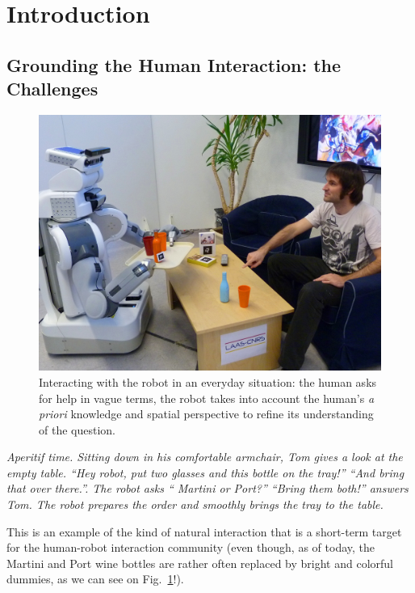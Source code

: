 \documentclass{svmult}
\begin{document}
\section{Introduction}

\subsection{Grounding the Human Interaction: the Challenges}

\begin{figure}%
	\centering
	\includegraphics[width=0.8\linewidth]{figs/aperitif_time.jpg} 

	\caption{Interacting with the robot in an everyday situation: the human
	asks for help in vague terms, the robot takes into account the human's {\it
	a priori} knowledge and spatial perspective to refine its understanding of
	the question.} 

	\label{fig|vpt} 
\end{figure}


{\em Aperitif time. Sitting down in his comfortable armchair, Tom gives a look
at the empty table. ``{\em Hey robot, put two glasses and this bottle on the
tray!}'' ``{\em And bring that over there.}''. The robot asks ``{\em
Martini or Port?}'' ``{\em Bring them both!}'' answers Tom. The robot prepares
the order and smoothly brings the tray to the table.} 

This is an example of the kind of natural interaction that is a short-term
target for the human-robot interaction community (even though, as of today, the
Martini and Port wine bottles are rather often replaced by bright and colorful
dummies, as we can see on Fig.~\ref{fig|vpt}!).
\end{document}
